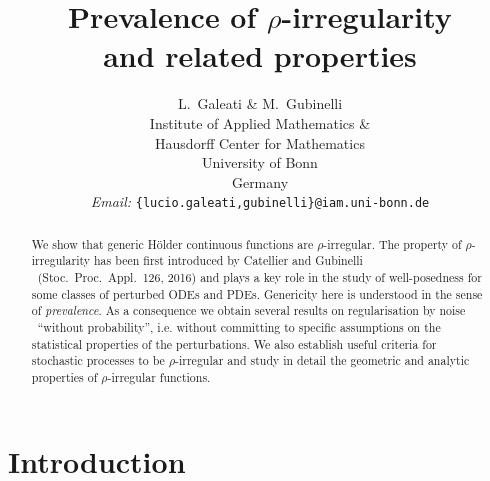 \documentclass[10pt]{article}
\newcommand{\tmaffiliation}[1]{\\ #1}
\newcommand{\tmemail}[1]{\\ \textit{Email:} \texttt{#1}}
\newcommand{\tmtextit}[1]{{\itshape{#1}}}
\begin{document}
\title{
  Prevalence of $\rho$-irregularity\\
  and related properties
}

\author{
  L.~Galeati \& M.~Gubinelli
  \tmaffiliation{Institute of Applied Mathematics \&\\
  Hausdorff Center for Mathematics\\
  University of Bonn\\
  Germany}
  \tmemail{\{lucio.galeati,gubinelli\}@iam.uni-bonn.de}
}

\maketitle

\begin{abstract}
  We show that generic H{\"o}lder continuous functions are $\rho$-irregular.
  The property of $\rho$-irregularity has been first introduced by Catellier
  and Gubinelli \ (Stoc.~Proc.~Appl.~126, 2016) and plays a key role in the
  study of well-posedness for some classes of perturbed ODEs and PDEs.
  Genericity here is understood in the sense of \tmtextit{prevalence}. As a
  consequence we obtain several results on regularisation by noise \ ``without
  probability'', i.e. without committing to specific assumptions on the
  statistical properties of the perturbations. We also establish useful
  criteria for stochastic processes to be $\rho$-irregular and study in detail
  the geometric and analytic properties of $\rho$-irregular functions.
\end{abstract}

{\tableofcontents}

\section{Introduction}
\end{document}
